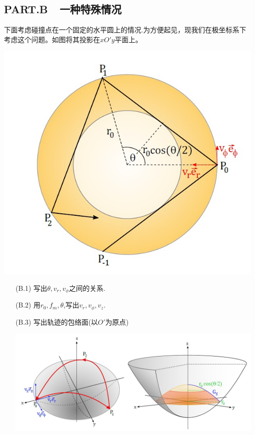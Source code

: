 \documentclass{article}
\begin{document}
\subsection*{PART.B\ \ 一种特殊情况}
下面考虑碰撞点在一个固定的水平圆上的情况.为方便起见，现我们在极坐标系下考虑这个问题。如图将其投影在$xO'y$平面上。\par
    \begin{center}
\includegraphics[scale=0.3]{img/2.jpg}\par    
    \end{center}

\begin{itemize}
    \item[(B.1)]写出$\theta,v_r,v_{\phi}$之间的关系.
    \item[(B.2)]用$r_0,f_m,\theta$,写出$v_r,v_{\phi},v_z$.
    \item[(B.3)]写出轨迹的包络面(以$O'$为原点)  
    \begin{center}
    \includegraphics[scale=0.4]{img/3.jpg}\par
    \end{center}

\end{itemize}
\end{document}
